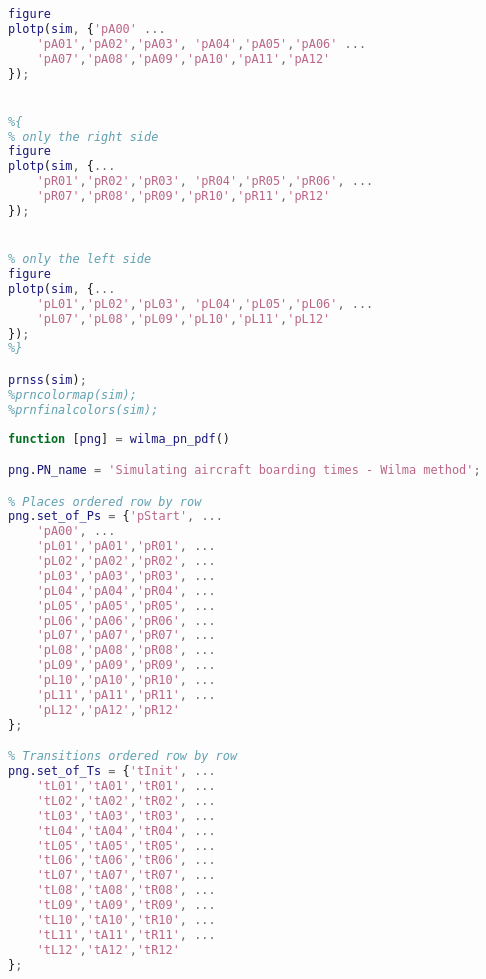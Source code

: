 \begin{lstlisting}[language=MATLAB, caption=wilma.m]
% only the aisle
figure
plotp(sim, {'pA00' ...
    'pA01','pA02','pA03', 'pA04','pA05','pA06' ...
    'pA07','pA08','pA09','pA10','pA11','pA12'
});


%{
% only the right side
figure
plotp(sim, {...
    'pR01','pR02','pR03', 'pR04','pR05','pR06', ...
    'pR07','pR08','pR09','pR10','pR11','pR12'
});


% only the left side
figure
plotp(sim, {...
    'pL01','pL02','pL03', 'pL04','pL05','pL06', ...
    'pL07','pL08','pL09','pL10','pL11','pL12'
});
%}

prnss(sim);
%prncolormap(sim);
%prnfinalcolors(sim);
\end{lstlisting}

\begin{lstlisting}[language=MATLAB, caption=wilma\_pn\_pdf.m]
function [png] = wilma_pn_pdf()

png.PN_name = 'Simulating aircraft boarding times - Wilma method';

% Places ordered row by row
png.set_of_Ps = {'pStart', ...
    'pA00', ...
    'pL01','pA01','pR01', ...
    'pL02','pA02','pR02', ...
    'pL03','pA03','pR03', ...
    'pL04','pA04','pR04', ...
    'pL05','pA05','pR05', ...
    'pL06','pA06','pR06', ...
    'pL07','pA07','pR07', ...
    'pL08','pA08','pR08', ...
    'pL09','pA09','pR09', ...
    'pL10','pA10','pR10', ...
    'pL11','pA11','pR11', ...
    'pL12','pA12','pR12'
};

% Transitions ordered row by row
png.set_of_Ts = {'tInit', ...
    'tL01','tA01','tR01', ...
    'tL02','tA02','tR02', ...
    'tL03','tA03','tR03', ...
    'tL04','tA04','tR04', ...
    'tL05','tA05','tR05', ...
    'tL06','tA06','tR06', ...
    'tL07','tA07','tR07', ...
    'tL08','tA08','tR08', ...
    'tL09','tA09','tR09', ...
    'tL10','tA10','tR10', ...
    'tL11','tA11','tR11', ...
    'tL12','tA12','tR12'
};


\end{lstlisting}
